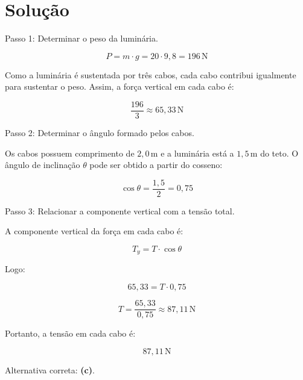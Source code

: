 \documentclass[a4paper,12pt]{article}
\newcommand{\printingbibliography}{%

    \pagestyle{myheadings}
    \markright{}
    \sloppy
    \printbibliography[heading=bibintoc, %
                   title=Refer\^encias %
                  ]
    \fussy%
}
\begin{document}
\section*{Solução}

Passo 1: Determinar o peso da luminária.

\[
P = m \cdot g = 20 \cdot 9,8 = 196 \, \mathrm{N}
\]

Como a luminária é sustentada por três cabos, cada cabo contribui igualmente para sustentar o peso. Assim, a força vertical em cada cabo é:

\[
\frac{196}{3} \approx 65,33 \, \mathrm{N}
\]

\bigskip
Passo 2: Determinar o ângulo formado pelos cabos.

Os cabos possuem comprimento de \(2,0 \, \mathrm{m}\) e a luminária está a \(1,5 \, \mathrm{m}\) do teto. O ângulo de inclinação \(\theta\) pode ser obtido a partir do cosseno:


\[
\cos \theta = \frac{1,5}{2} = 0,75
\]

\bigskip
Passo 3: Relacionar a componente vertical com a tensão total.

A componente vertical da força em cada cabo é:

\[
T_y = T \cdot \cos \theta
\]

Logo:

\[
65,33 = T \cdot 0,75
\]

\[
T = \frac{65,33}{0,75} \approx 87,11 \, \mathrm{N}
\]

\bigskip
\noindent
Portanto, a tensão em cada cabo é:

\[
\boxed{87,11 \, \mathrm{N}}
\]

\bigskip
\noindent
Alternativa correta: \textbf{(c)}.

\end{document}
